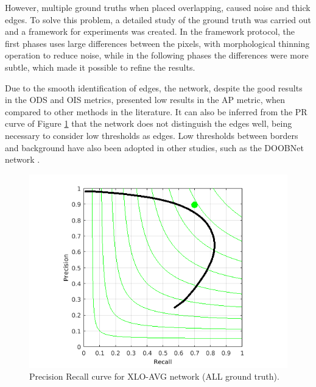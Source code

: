 However, multiple ground truths when placed overlapping, caused noise and thick edges.
To solve this problem, a detailed study of the ground truth was carried out and a framework for experiments was created.
In the framework protocol, the first phases uses large differences between the pixels, with morphological thinning operation to reduce noise, while in the following phases the differences were more subtle, which made it possible to refine the results.


Due to the smooth identification of edges, the network, despite the good results in the ODS and OIS metrics, presented low results in the AP metric, when compared to other methods in the literature.
It can also be inferred from the PR curve of Figure \ref{fig:bsds_xlo_avg_curve} that the network does not distinguish the edges well, being necessary to consider low thresholds as edges. 
Low thresholds between borders and background have also been adopted in other studies, such as the DOOBNet network \cite{Cumulative:Song20181847}.

\begin{figure}%
  \centering
  \includegraphics[width=0.9\columnwidth]{../imagens/graficos/cap6_xlo-avg.png}
  \caption{\color{red}Precision Recall curve for XLO-AVG network (ALL ground truth).}
  \label{fig:bsds_xlo_avg_curve}
\end{figure}

